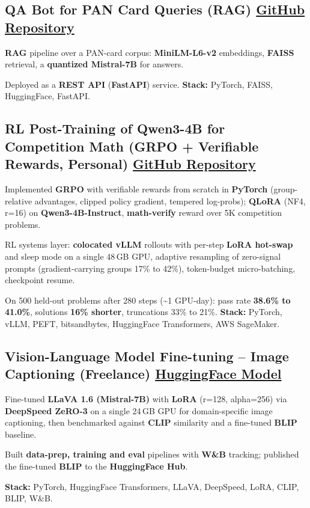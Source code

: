 \documentclass[letter,10pt]{article}
\begin{document}
\subsection{QA Bot for PAN Card Queries (RAG) \hfill \href{https://github.com/sunil448832/Natural-Language-Processing/tree/master/RAG(Retrieval\%20Augment\%20Generation)}{GitHub Repository}}
\begin{zitemize}
\item \textbf{RAG} pipeline over a PAN-card corpus: \textbf{MiniLM-L6-v2} embeddings, \textbf{FAISS} retrieval, a \textbf{quantized Mistral-7B} for answers.
\item Deployed as a \textbf{REST API} (\textbf{FastAPI}) service. \textbf{Stack:} PyTorch, FAISS, HuggingFace, FastAPI.
\end{zitemize}

\subsection{RL Post-Training of Qwen3-4B for Competition Math (GRPO + Verifiable Rewards, Personal) \hfill \href{https://github.com/sunil448832/preference-alignment-grpo}{GitHub Repository}}
\begin{zitemize}
\item Implemented \textbf{GRPO} with verifiable rewards from scratch in \textbf{PyTorch} (group-relative advantages, clipped policy gradient, tempered log-probs); \textbf{QLoRA} (NF4, r=16) on \textbf{Qwen3-4B-Instruct}, \textbf{math-verify} reward over 5K competition problems.
\item RL systems layer: \textbf{colocated vLLM} rollouts with per-step \textbf{LoRA hot-swap} and sleep mode on a single 48\,GB GPU, adaptive resampling of zero-signal prompts (gradient-carrying groups 17\% to 42\%), token-budget micro-batching, checkpoint resume.
\item On 500 held-out problems after 280 steps (\textasciitilde1 GPU-day): pass rate \textbf{38.6\% to 41.0\%}, solutions \textbf{16\% shorter}, truncations 33\% to 21\%. \textbf{Stack:} PyTorch, vLLM, PEFT, bitsandbytes, HuggingFace Transformers, AWS SageMaker.
\end{zitemize}

\subsection{Vision-Language Model Fine-tuning – Image Captioning (Freelance) \hfill \href{https://huggingface.co/sunil448832/blip-model}{HuggingFace Model}}
\begin{zitemize}
\item Fine-tuned \textbf{LLaVA 1.6 (Mistral-7B)} with \textbf{LoRA} (r=128, alpha=256) via \textbf{DeepSpeed ZeRO-3} on a single 24\,GB GPU for domain-specific image captioning, then benchmarked against \textbf{CLIP} similarity and a fine-tuned \textbf{BLIP} baseline.
\item Built \textbf{data-prep, training and eval} pipelines with \textbf{W\&B} tracking; published the fine-tuned \textbf{BLIP} to the \textbf{HuggingFace Hub}.
\item \textbf{Stack:} PyTorch, HuggingFace Transformers, LLaVA, DeepSpeed, LoRA, CLIP, BLIP, W\&B.
\end{zitemize}
\end{document}
